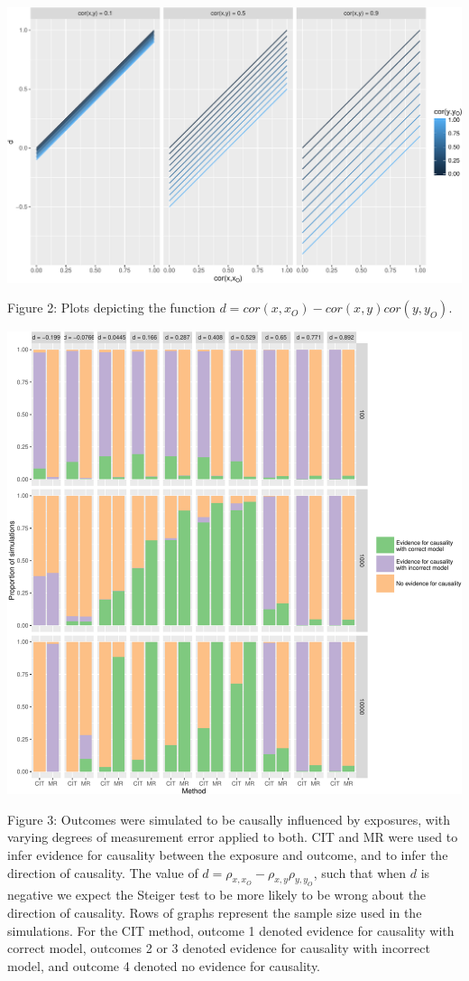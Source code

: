 \documentclass[]{article}
\begin{document}
\newpage

\includegraphics{manuscript_files/figure-latex/d_relationship_figure-1.pdf}

Figure 2: Plots depicting the function
$d = cor(x, x_O) - cor(x,y)cor(y, y_O)$.

\newpage

\includegraphics{manuscript_files/figure-latex/cit_mr_comparison_figure-1.pdf}

Figure 3: Outcomes were simulated to be causally influenced by
exposures, with varying degrees of measurement error applied to both.
CIT and MR were used to infer evidence for causality between the
exposure and outcome, and to infer the direction of causality. The value
of $d = \rho_{x, x_O} - \rho_{x,y}\rho_{y,y_O}$, such that when $d$ is
negative we expect the Steiger test to be more likely to be wrong about
the direction of causality. Rows of graphs represent the sample size
used in the simulations. For the CIT method, outcome 1 denoted evidence
for causality with correct model, outcomes 2 or 3 denoted evidence for
causality with incorrect model, and outcome 4 denoted no evidence for
causality.
\end{document}
